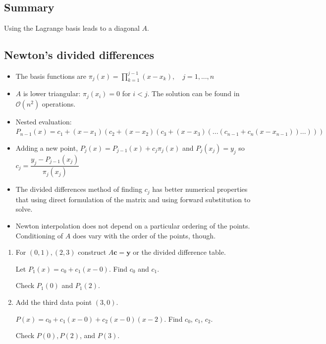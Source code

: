 \documentclass[12pt,letterpaper,noanswers]{exam}
\begin{document}
\subsection*{Summary}
Using the Lagrange basis leads to a diagonal $A$.  


\subsection*{Newton's divided differences}
\begin{tcolorbox}
\begin{itemize}
    \item The basis functions are $\pi_j(x) = \prod\limits_{k = 1}^{j-1}(x-x_k),\quad j = 1,...,n$
    \item $A$ is lower triangular: $\pi_j(x_i) = 0$ for $i<j$.  The solution can be found in $\mathcal{O}(n^2)$ operations.
    \item Nested evaluation: $P_{n-1}(x) = c_1 + (x-x_1)(c_2 + (x-x_2)(c_3+ (x-x_3)(...(c_{n-1} + c_n(x-x_{n-1}))...)))$
    \item Adding a new point, $P_j(x) = P_{j-1}(x) + c_j\pi_j(x)$ and $P_j(x_j) = y_j$ so $c_j = \dfrac{y_j - P_{j-1}(x_{j})}{\pi_j(x_j)}$
    \item The divided differences method of finding $c_j$ has better numerical properties that using direct formulation of the matrix and using forward substitution to solve.
    \item Newton interpolation does not depend on a particular ordering of the points.  Conditioning of $A$ does vary with the order of the points, though. 

\end{itemize}
    
\end{tcolorbox}


\begin{enumerate}[resume]
\item For $(0,1), (2,3)$ construct $A\mathbf{c} = \mathbf{y}$ or the divided difference table.



Let $P_1(x) = c_0 + c_1(x-0)$.  Find $c_0$ and $c_1$.

Check $P_1(0)$ and $P_1(2)$.

\item Add the third data point $(3,0)$.

$P(x) = c_0 + c_1(x-0) + c_2(x-0)(x-2)$.  Find $c_0$, $c_1$, $c_2$.

Check $P(0), P(2)$, and $P(3)$.
\end{enumerate}
\end{document}
